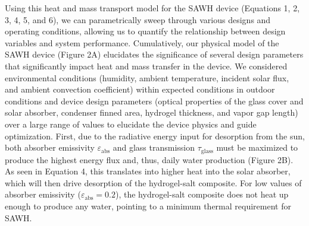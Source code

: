 \documentclass[11pt]{article}
\begin{document}
Using this heat and mass transport model for the SAWH device (Equations 1, 2, 3, 4, 5, and 6), we can parametrically sweep through various designs and operating conditions, allowing us to quantify the relationship between design variables and system performance. Cumulatively, our physical model of the SAWH device (Figure 2A) elucidates the significance of several design parameters that significantly impact heat and mass transfer in the device. We considered environmental conditions (humidity, ambient temperature, incident solar flux, and ambient convection coefficient) within expected conditions in outdoor conditions and device design parameters (optical properties of the glass cover and solar absorber, condenser finned area, hydrogel thickness, and vapor gap length) over a large range of values to elucidate the device physics and guide optimization. First, due to the radiative energy input for desorption from the sun, both absorber emissivity $\varepsilon_{\mathrm{abs}}$ and glass transmission $\tau_{\mathrm{glass}}$ must be maximized to produce the highest energy flux and, thus, daily water production (Figure 2B). As seen in Equation 4, this translates into higher heat into the solar absorber, which will then drive desorption of the hydrogel-salt composite. For low values of absorber emissivity ($\varepsilon_{\mathrm{abs}} = 0.2$), the hydrogel-salt composite does not heat up enough to produce any water, pointing to a minimum thermal requirement for SAWH.
\end{document}
